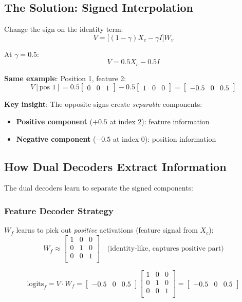 \documentclass[12pt]{article}
\begin{document}
\subsection*{The Solution: Signed Interpolation}

Change the sign on the identity term:
\[
V = \bigl[(1-\gamma)X_c - \gamma I\bigr]W_v
\]

At $\gamma = 0.5$:
\[
V = 0.5 X_c - 0.5 I
\]

\textbf{Same example}: Position 1, feature 2:
\[
V[\text{pos 1}] = 0.5 \begin{bmatrix} 0 & 0 & 1 \end{bmatrix} - 0.5 \begin{bmatrix} 1 & 0 & 0 \end{bmatrix}
= \begin{bmatrix} -0.5 & 0 & 0.5 \end{bmatrix}
\]

\textbf{Key insight}: The opposite signs create \emph{separable} components:
\begin{itemize}
    \item \textbf{Positive component} ($+0.5$ at index 2): feature information
    \item \textbf{Negative component} ($-0.5$ at index 0): position information
\end{itemize}

\subsection*{How Dual Decoders Extract Information}

The dual decoders learn to separate the signed components:

\subsubsection*{Feature Decoder Strategy}

$W_f$ learns to pick out \emph{positive} activations (feature signal from $X_c$):
\[
W_f \approx \begin{bmatrix}
1 & 0 & 0 \\
0 & 1 & 0 \\
0 & 0 & 1 \\
\end{bmatrix}
\quad \text{(identity-like, captures positive part)}
\]

\[
\text{logits}_f = V \cdot W_f = \begin{bmatrix} -0.5 & 0 & 0.5 \end{bmatrix}
\begin{bmatrix}
1 & 0 & 0 \\
0 & 1 & 0 \\
0 & 0 & 1 \\
\end{bmatrix}
= \begin{bmatrix} -0.5 & 0 & \mathbf{0.5} \end{bmatrix}
\]
\end{document}
